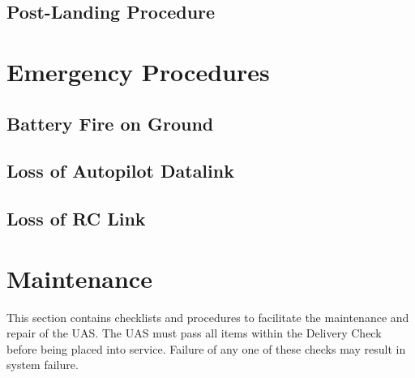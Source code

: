 \documentclass{report}
\begin{document}
	\section{Post-Landing Procedure}
\chapter{Emergency Procedures}
	\section{Battery Fire on Ground}
	\section{Loss of Autopilot Datalink}
	\section{Loss of RC Link}
\chapter{Maintenance}
	This section contains checklists and procedures to facilitate the maintenance and repair of the UAS.  The UAS must pass all items within the Delivery Check before being placed into service.  Failure of any one of these checks may result in system failure.
\end{document}

